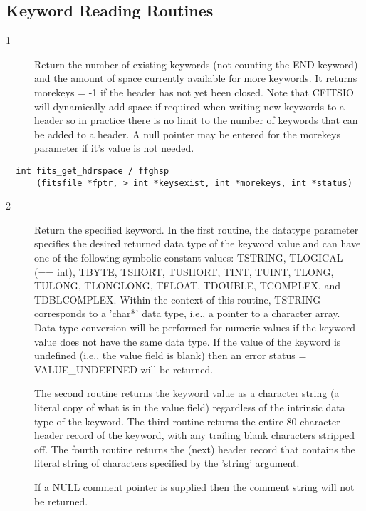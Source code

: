 \documentclass[11pt]{book}
\begin{document}
\subsection{Keyword Reading Routines}


\begin{description}
\item[1 ] Return the number of existing keywords (not counting the
    END keyword) and the amount of space currently available for more
    keywords.  It returns morekeys = -1 if the header has not yet been
    closed.  Note that CFITSIO will dynamically add space if required
    when writing new keywords to a header so in practice there is no
    limit to the number of keywords that can be added to a header.  A
    null pointer may be entered for the morekeys parameter if it's
   value is not needed. \label{ffghsp}
\end{description}

\begin{verbatim}
  int fits_get_hdrspace / ffghsp
      (fitsfile *fptr, > int *keysexist, int *morekeys, int *status)
\end{verbatim}

\begin{description}
\item[2 ] Return the specified keyword.  In the first routine,
    the datatype parameter specifies the desired returned data type of the
    keyword value and can have one of the following symbolic constant
    values:  TSTRING, TLOGICAL (== int), TBYTE, TSHORT, TUSHORT, TINT,
    TUINT, TLONG, TULONG, TLONGLONG, TFLOAT, TDOUBLE, TCOMPLEX, and TDBLCOMPLEX.
    Within the context of this routine, TSTRING corresponds to a
    'char*' data type, i.e., a pointer to a character array.  Data type
    conversion will be performed for numeric values if the keyword
    value does not have the same data type.  If the value of the keyword
    is undefined (i.e., the value field is blank) then an error status
    = VALUE\_UNDEFINED will be returned.

    The second routine returns the keyword value as a character string
    (a literal copy of what is in the value field) regardless of the
    intrinsic data type of the keyword.  The third routine returns
    the entire 80-character header record of the keyword, with any
    trailing blank characters stripped off. The fourth routine returns
    the (next) header record that contains the literal string of characters
    specified by the 'string' argument.

    If a NULL comment pointer is supplied then the comment string
   will not be returned. \label{ffgky} \label{ffgkey} \label{ffgcrd}
\end{description}
\end{document}
